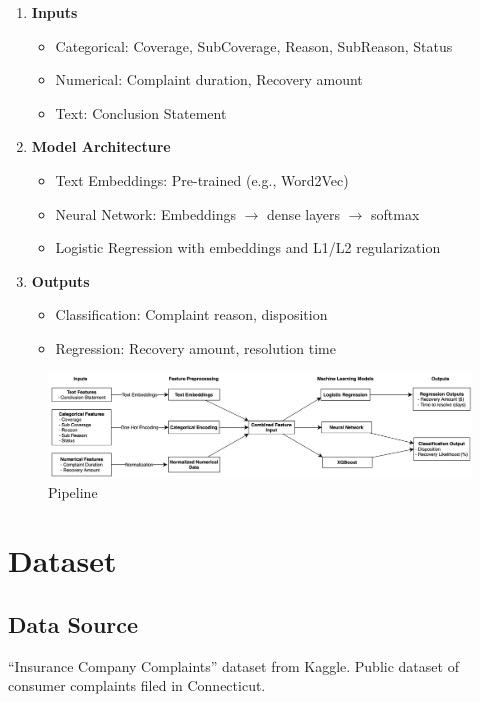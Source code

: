 \documentclass[final]{article}
\begin{document}
\begin{enumerate}
  \item \textbf{Inputs}
    \begin{itemize}
      \item Categorical: Coverage, SubCoverage, Reason, SubReason, Status
      \item Numerical: Complaint duration, Recovery amount
      \item Text: Conclusion Statement
    \end{itemize}
  \item \textbf{Model Architecture}
    \begin{itemize}
      \item Text Embeddings: Pre-trained (e.g., Word2Vec)
      \item Neural Network: Embeddings $\rightarrow$ dense layers $\rightarrow$ softmax
      \item Logistic Regression with embeddings and L1/L2 regularization
    \end{itemize}
  \item \textbf{Outputs}
    \begin{itemize}
      \item Classification: Complaint reason, disposition
      \item Regression: Recovery amount, resolution time
    \end{itemize}
\end{enumerate}

\begin{figure}[h]
  \centering
  \includegraphics[width=1.0\textwidth]{ml-flowchart.png}
  \caption{Pipeline}
  \label{fig: Pipeline}
\end{figure}

\section{Dataset}

\subsection{Data Source}
“Insurance Company Complaints” dataset from Kaggle. Public dataset of consumer complaints filed in Connecticut.
\end{document}
